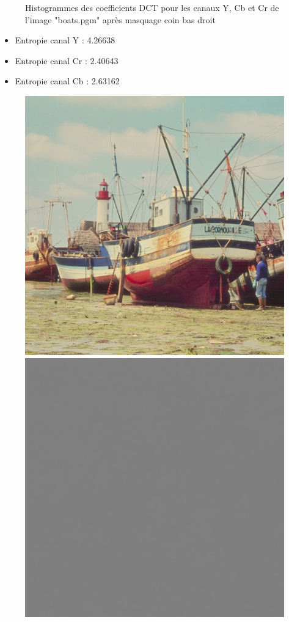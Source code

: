 \documentclass[12pt]{report}
\begin{document}
\begin{figure}[H]
\begin{center}
\caption{Histogrammes des coefficients DCT pour les canaux Y, Cb et Cr de l'image "boats.pgm" après masquage coin bas droit}
\end{center}
\end{figure}

\begin{itemize}
\item Entropie canal Y : 4.26638
\item Entropie canal Cr : 2.40643
\item Entropie canal Cb : 2.63162
\end{itemize}

\begin{figure}[H]
\begin{center}
\includegraphics[scale=0.4]{../ImageRes/idct_masked0_result.jpg} 
\includegraphics[scale=0.4]{../ImageRes/idct_masked0_disto.jpg} 

\end{center}
\end{figure}
\end{document}
